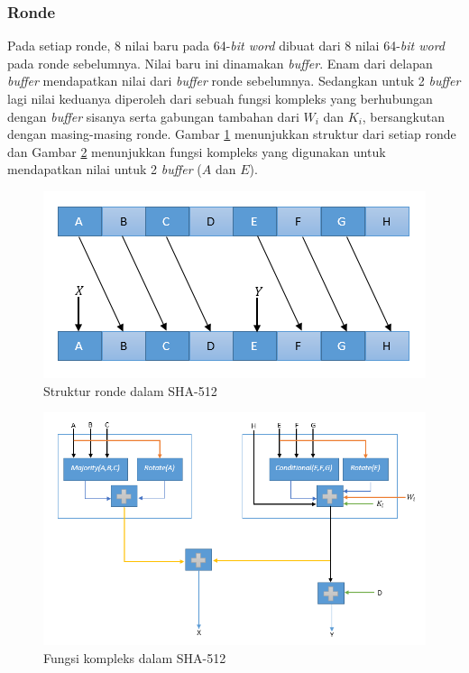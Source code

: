 \subsubsection{Ronde}
\label{sssec:rondesha512}
Pada setiap ronde, 8 nilai baru pada 64-\textit{bit word} dibuat dari 8 nilai 64-\textit{bit word} pada ronde sebelumnya. Nilai baru ini dinamakan \textit{buffer}. Enam dari delapan \textit{buffer} mendapatkan nilai dari \textit{buffer} ronde sebelumnya. Sedangkan untuk 2 \textit{buffer} lagi nilai keduanya diperoleh dari sebuah fungsi kompleks yang berhubungan dengan \textit{buffer} sisanya serta gabungan tambahan dari \begin{math}W_i\end{math} dan \begin{math}K_i\end{math}, bersangkutan dengan masing-masing ronde. Gambar \ref{fig:rondesha} menunjukkan struktur dari setiap ronde dan Gambar \ref{fig:fungsikompleks} menunjukkan fungsi kompleks yang digunakan untuk mendapatkan nilai untuk 2 \textit{buffer} (\begin{math}A\end{math} dan \begin{math}E\end{math}).

\begin{figure}[H]
	\includegraphics[scale=0.8]{Gambar/sha_round}
	\centering
	\caption{Struktur ronde dalam SHA-512}\label{fig:rondesha}
\end{figure}

\begin{figure}[H]
	\includegraphics[scale=0.7]{Gambar/complex_function}
	\centering
	\caption{Fungsi kompleks dalam SHA-512}\label{fig:fungsikompleks}
\end{figure}


